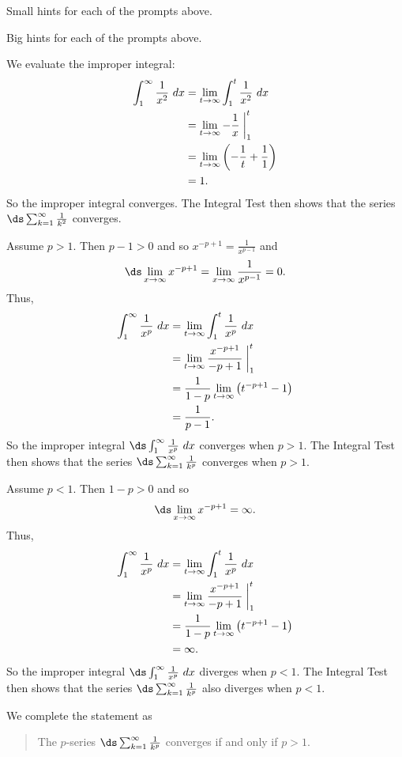 \begin{smallhint}
\ba
	\item Small hints for each of the prompts above.
\ea
\end{smallhint}
\begin{bighint}
\ba
	\item Big hints for each of the prompts above.
\ea
\end{bighint}
\begin{activitySolution}
\ba
	\item We evaluate the improper integral:
\begin{align*}
\int_{1}^{\infty} \frac{1}{x^2} \ dx &= \lim_{t \to \infty} \int_{1}^{t} \frac{1}{x^2} \ dx \\
    &= \lim_{t \to \infty} -\frac{1}{x} \biggm|_{1}^{t} \\
    &= \lim_{t \to \infty} \left(-\frac{1}{t} + \frac{1}{1} \right) \\
    &= 1.
\end{align*}
So the improper integral converges. The Integral Test then shows that the series $\ds \sum_{k=1}^{\infty} \frac{1}{k^2}$ converges.
    \item Assume $p > 1$. Then $p-1 > 0$ and so $x^{-p+1} = \frac{1}{x^{p-1}}$ and
\[\ds \lim_{x \to \infty} x^{-p+1} = \lim_{x \to \infty} \frac{1}{x^{p-1}} = 0.\]
Thus,
\begin{align*}
\int_{1}^{\infty} \frac{1}{x^p} \ dx &= \lim_{t \to \infty} \int_{1}^{t} \frac{1}{x^p} \ dx \\
    &= \lim_{t \to \infty} \frac{x^{-p+1}}{-p+1} \biggm|_{1}^{t} \\
    &= \frac{1}{1-p} \lim_{t \to \infty} \left(t^{-p+1} -  1 \right) \\
    &= \frac{1}{p-1}.
\end{align*}
So the improper integral $\ds \int_1^{\infty} \frac{1}{x^p} \ dx$ converges when $p > 1$. The Integral Test then shows that the series $\ds \sum_{k=1}^{\infty} \frac{1}{k^p}$ converges when $p > 1$.
    \item Assume $p < 1$. Then $1-p > 0$ and so
\[\ds \lim_{x \to \infty} x^{-p+1} = \infty.\]
Thus,
\begin{align*}
\int_{1}^{\infty} \frac{1}{x^p} \ dx &= \lim_{t \to \infty} \int_{1}^{t} \frac{1}{x^p} \ dx \\
    &= \lim_{t \to \infty} \frac{x^{-p+1}}{-p+1} \biggm|_{1}^{t} \\
    &= \frac{1}{1-p} \lim_{t \to \infty} \left(t^{-p+1} -  1 \right) \\
    &= \infty.
\end{align*}
So the improper integral $\ds \int_1^{\infty} \frac{1}{x^p} \ dx$ diverges when $p < 1$. The Integral Test then shows that the series $\ds \sum_{k=1}^{\infty} \frac{1}{k^p}$ also diverges when $p < 1$.
    \item We complete the statement as
\begin{quote}
The $p$-series $\ds \sum_{k=1}^{\infty} \frac{1}{k^p}$ converges if and only if $p > 1$.
\end{quote}
\ea
\end{activitySolution}
\aftera 